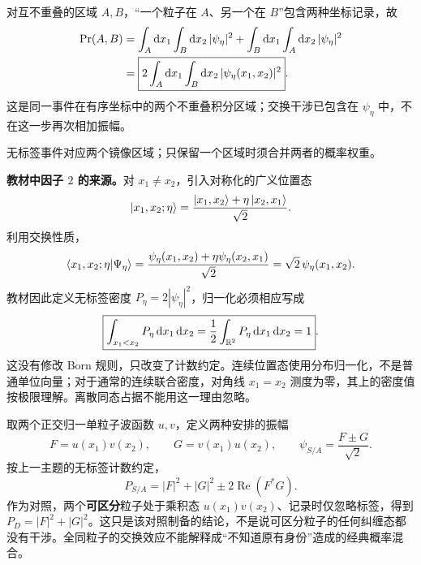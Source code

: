 对互不重叠的区域 $A,B$，“一个粒子在 $A$、另一个在 $B$”包含两种坐标记录，故
\begin{align}
  \Pr(A,B)
  &=\int_A\mathop{}\!\mathrm{d} x_1\int_B\mathop{}\!\mathrm{d} x_2\,|\psi_\eta|^2
    +\int_B\mathop{}\!\mathrm{d} x_1\int_A\mathop{}\!\mathrm{d} x_2\,|\psi_\eta|^2\notag\\
  &=\boxed{2\int_A\mathop{}\!\mathrm{d} x_1\int_B\mathop{}\!\mathrm{d} x_2\,|\psi_\eta(x_1,x_2)|^2}.
  \label{eq:QM-C10-S03-unordered-event}
\end{align}
这是同一事件在有序坐标中的两个不重叠积分区域；交换干涉已包含在 $\psi_\eta$ 中，不在这一步再次相加振幅。

\begin{center}

{\small 无标签事件对应两个镜像区域；只保留一个区域时须合并两者的概率权重。}
\end{center}

\textbf{教材中因子 $2$ 的来源。}对 $x_1\ne x_2$，引入对称化的广义位置态
\begin{equation}
  \left|x_1,x_2;\eta\right\rangle
   =\frac{\left|x_1,x_2\right\rangle+\eta\left|x_2,x_1\right\rangle}{\sqrt2}.
\end{equation}
利用交换性质，
\begin{equation}
  \left\langle x_1,x_2;\eta \middle| \Psi_\eta \right\rangle
   =\frac{\psi_\eta(x_1,x_2)+\eta\psi_\eta(x_2,x_1)}{\sqrt2}
   =\sqrt2\,\psi_\eta(x_1,x_2).
\end{equation}
教材因此定义无标签密度 $P_\eta=2|\psi_\eta|^2$，归一化必须相应写成
\begin{equation}
  \boxed{\int_{x_1<x_2}P_\eta\mathop{}\!\mathrm{d} x_1\mathop{}\!\mathrm{d} x_2
    =\frac12\int_{\mathbb{R}^2}P_\eta\mathop{}\!\mathrm{d} x_1\mathop{}\!\mathrm{d} x_2=1}.
\end{equation}
这没有修改 Born 规则，只改变了计数约定。连续位置态使用分布归一化，不是普通单位向量；对于通常的连续联合密度，对角线 $x_1=x_2$ 测度为零，其上的密度值按极限理解。离散同态占据不能用这一理由忽略。

取两个正交归一单粒子波函数 $u,v$，定义两种安排的振幅
\begin{equation}
  F=u(x_1)v(x_2),\qquad G=v(x_1)u(x_2),\qquad
  \psi_{S/A}=\frac{F\pm G}{\sqrt2}.
\end{equation}
按上一主题的无标签计数约定，
\begin{equation}
  \boxed{P_{S/A}=|F|^2+|G|^2\pm2\operatorname{Re}(F^*G)}.
  \label{eq:QM-C10-S03-interference}
\end{equation}
作为对照，两个\textbf{可区分}粒子处于乘积态 $u(x_1)v(x_2)$、记录时仅忽略标签，得到 $P_D=|F|^2+|G|^2$。这只是该对照制备的结论，不是说可区分粒子的任何纠缠态都没有干涉。全同粒子的交换效应不能解释成“不知道原有身份”造成的经典概率混合。

